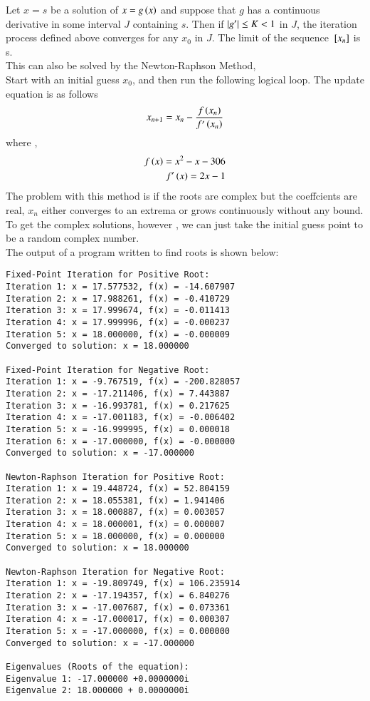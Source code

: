 \documentclass[journal]{IEEEtran}
\begin{document}
Let $x = s$ be a solution of $x = g\left(x\right)$ and suppose that $g$ has a continuous
derivative in some interval $J$ containing $s$. Then if $\left\vert g^{\prime}\right\vert \le K < 1$ in $J$,
the iteration process defined  above converges for any $x_0$ in $J$. The limit of the sequence
${}\left[x_n\right]$ is s.\\
\newline
This can also be solved by the Newton-Raphson Method,\\
Start with an initial guess $x_0$, and then run the following logical loop. The update equation is as follows
\begin{align}
    x_{n+1} = x_n - \frac{f\left(x_n\right)}{f^{\prime}\left(x_n\right)} 
\end{align}
where ,
\begin{align}
    f\left(x\right) = x^2 - x - 306\\
    f^{\prime}\left(x\right) = 2x-1
\end{align}
\newline
The problem with this method is if the roots are complex but the coeffcients are real, $x_n$ either converges to an extrema or grows continuously without any bound.
To get the complex solutions, however , we can just take the initial guess point to be a 
random complex number.\\
The output of a program written to find roots is shown below:
\begin{verbatim}
Fixed-Point Iteration for Positive Root:
Iteration 1: x = 17.577532, f(x) = -14.607907
Iteration 2: x = 17.988261, f(x) = -0.410729
Iteration 3: x = 17.999674, f(x) = -0.011413
Iteration 4: x = 17.999996, f(x) = -0.000237
Iteration 5: x = 18.000000, f(x) = -0.000009
Converged to solution: x = 18.000000

Fixed-Point Iteration for Negative Root:
Iteration 1: x = -9.767519, f(x) = -200.828057
Iteration 2: x = -17.211406, f(x) = 7.443887
Iteration 3: x = -16.993781, f(x) = 0.217625
Iteration 4: x = -17.001183, f(x) = -0.006402
Iteration 5: x = -16.999995, f(x) = 0.000018
Iteration 6: x = -17.000000, f(x) = -0.000000
Converged to solution: x = -17.000000

Newton-Raphson Iteration for Positive Root:
Iteration 1: x = 19.448724, f(x) = 52.804159
Iteration 2: x = 18.055381, f(x) = 1.941406
Iteration 3: x = 18.000887, f(x) = 0.003057
Iteration 4: x = 18.000001, f(x) = 0.000007
Iteration 5: x = 18.000000, f(x) = 0.000000
Converged to solution: x = 18.000000

Newton-Raphson Iteration for Negative Root:
Iteration 1: x = -19.809749, f(x) = 106.235914
Iteration 2: x = -17.194357, f(x) = 6.840276
Iteration 3: x = -17.007687, f(x) = 0.073361
Iteration 4: x = -17.000017, f(x) = 0.000307
Iteration 5: x = -17.000000, f(x) = 0.000000
Converged to solution: x = -17.000000

Eigenvalues (Roots of the equation):
Eigenvalue 1: -17.000000 +0.0000000i
Eigenvalue 2: 18.000000 + 0.0000000i
\end{verbatim}
\end{document}
